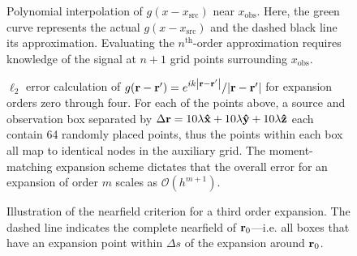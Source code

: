 \begin{figure}
  \centering
  
  \caption{\label{fig:1d moments} Polynomial interpolation of $g(x - x_\text{src})$ near $x_\text{obs}$.
    Here, the green curve represents the actual $g(x - x_\text{src})$ and the dashed black line its approximation.
    Evaluating the $n^\text{th}$-order approximation requires knowledge of the signal at $n + 1$ grid points surrounding $x_\text{obs}$.
  }
\end{figure}

\begin{figure}
  \centering
  
  \caption{\label{fig:grid convergence} $\ell_2$ error calculation of $g(\vb{r} - \vb{r}') = e^{i k \abs{\vb{r} - \vb{r}'}}/{\abs{\vb{r} - \vb{r}'}}$ for expansion orders zero through four.
    For each of the points above, a source and observation box separated by $\Delta \vb{r} = 10\lambda \vu{x} + 10 \lambda \vu{y} + 10 \lambda \vu{z}$ each contain 64 randomly placed points, thus the points within each box all map to identical nodes in the auxiliary grid. 
    The moment-matching expansion scheme dictates that the overall error for an expansion of order $m$ scales as $\mathcal{O}(h^{m + 1})$.
  }
\end{figure}

\begin{figure}
  \centering
  
  \caption{\label{fig:nearfield criterion}Illustration of the nearfield criterion for a third order expansion.
    The dashed line indicates the complete nearfield of \textcolor{cbblue}{$\vb{r}_0$}---i.e. all boxes that have an expansion point within $\Delta s$ of the expansion around \textcolor{cbblue}{$\vb{r}_0$}.
  }
\end{figure}

